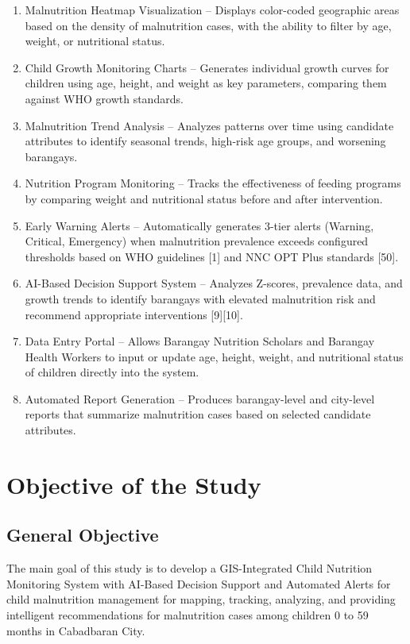 \documentclass[12pt, a4paper]{report}
\begin{document}
\begin{enumerate}
    \item Malnutrition Heatmap Visualization -- Displays color-coded geographic areas based on the density of malnutrition cases, with the ability to filter by age, weight, or nutritional status.
    \item Child Growth Monitoring Charts -- Generates individual growth curves for children using age, height, and weight as key parameters, comparing them against WHO growth standards.
    \item Malnutrition Trend Analysis -- Analyzes patterns over time using candidate attributes to identify seasonal trends, high-risk age groups, and worsening barangays.
    \item Nutrition Program Monitoring -- Tracks the effectiveness of feeding programs by comparing weight and nutritional status before and after intervention.
    \item Early Warning Alerts -- Automatically generates 3-tier alerts (Warning, Critical, Emergency) when malnutrition prevalence exceeds configured thresholds based on WHO guidelines [1] and NNC OPT Plus standards [50].
    \item AI-Based Decision Support System -- Analyzes Z-scores, prevalence data, and growth trends to identify barangays with elevated malnutrition risk and recommend appropriate interventions [9][10].
    \item Data Entry Portal -- Allows Barangay Nutrition Scholars and Barangay Health Workers to input or update age, height, weight, and nutritional status of children directly into the system.
    \item Automated Report Generation -- Produces barangay-level and city-level reports that summarize malnutrition cases based on selected candidate attributes.
\end{enumerate}

\section{Objective of the Study}
\label{sec:objectives}

\subsection{General Objective}
The main goal of this study is to develop a GIS-Integrated Child Nutrition Monitoring System with AI-Based Decision Support and Automated Alerts for child malnutrition management for mapping, tracking, analyzing, and providing intelligent recommendations for malnutrition cases among children 0 to 59 months in Cabadbaran City.
\end{document}
